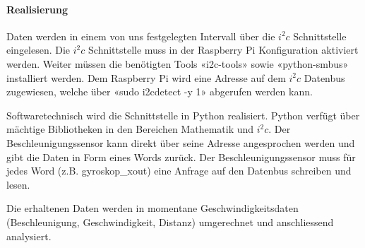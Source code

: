 \documentclass[../../main.tex]{subfiles}
\begin{document}
\paragraph{Realisierung}
Daten werden in einem von uns festgelegten Intervall über die $i^2c$ Schnittstelle eingelesen. Die $i^2c$ Schnittstelle muss in der Raspberry Pi Konfiguration aktiviert werden. Weiter müssen die benötigten Tools «i2c-tools» sowie «python-smbus» installiert werden. Dem Raspberry Pi wird eine Adresse auf dem $i^2c$ Datenbus zugewiesen, welche über «sudo i2cdetect -y 1» abgerufen werden kann.

Softwaretechnisch wird die Schnittstelle in Python realisiert. Python verfügt über mächtige Bibliotheken in den
Bereichen Mathematik und $i^2c$. Der Beschleunigungssensor kann direkt über seine Adresse angesprochen werden und gibt
die Daten in Form eines Words zurück. Der Beschleunigungssensor muss für jedes Word (z.B. gyroskop\_xout) eine Anfrage
auf den Datenbus schreiben und lesen.

Die erhaltenen Daten werden in momentane Geschwindigkeitsdaten (Beschleunigung, Geschwindigkeit, Distanz) umgerechnet und anschliessend analysiert.
\end{document}
